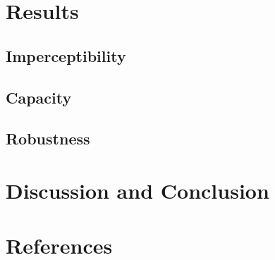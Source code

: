 \documentclass[11pt]{article}
\begin{document}
\section{Results}


\subsection{Imperceptibility}

\subsection{Capacity}

\subsection{Robustness}


\section{Discussion and Conclusion}


\section{References}
\end{document}
